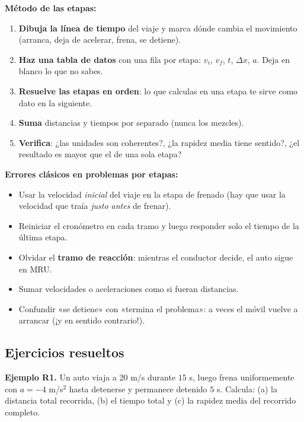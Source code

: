 \documentclass[12pt, letterpaper]{article}
\begin{document}
\begin{cuadropasos}
  \textbf{Método de las etapas:}
  \begin{enumerate}[leftmargin=*]
    \item \textbf{Dibuja la línea de tiempo} del viaje y marca dónde cambia el movimiento (arranca, deja de acelerar, frena, se detiene).
    \item \textbf{Haz una tabla de datos} con una fila por etapa: $v_i$, $v_f$, $t$, $\Delta x$, $a$. Deja en blanco lo que no sabes.
    \item \textbf{Resuelve las etapas en orden}: lo que calculas en una etapa te sirve como dato en la siguiente.
    \item \textbf{Suma} distancias y tiempos por separado (nunca los mezcles).
    \item \textbf{Verifica}: ¿las unidades son coherentes?, ¿la rapidez media tiene sentido?, ¿el resultado es mayor que el de una sola etapa?
  \end{enumerate}
\end{cuadropasos}

\begin{cuadroadvertencia}
  \textbf{Errores clásicos en problemas por etapas:}
  \begin{itemize}[leftmargin=*]
    \item Usar la velocidad \emph{inicial} del viaje en la etapa de frenado (hay que usar la velocidad que traía \emph{justo antes} de frenar).
    \item Reiniciar el cronómetro en cada tramo y luego responder solo el tiempo de la última etapa.
    \item Olvidar el \textbf{tramo de reacción}: mientras el conductor decide, el auto sigue en MRU.
    \item Sumar velocidades o aceleraciones como si fueran distancias.
    \item Confundir «se detiene» con «termina el problema»: a veces el móvil vuelve a arrancar (¡y en sentido contrario!).
  \end{itemize}
\end{cuadroadvertencia}

\subsection{Ejercicios resueltos}

\textbf{Ejemplo R1.} Un auto viaja a $20$ m/s durante $15$ s, luego frena uniformemente con $a = -4$ m/s$^2$ hasta detenerse y permanece detenido $5$ s. Calcula: (a) la distancia total recorrida, (b) el tiempo total y (c) la rapidez media del recorrido completo.
\end{document}
